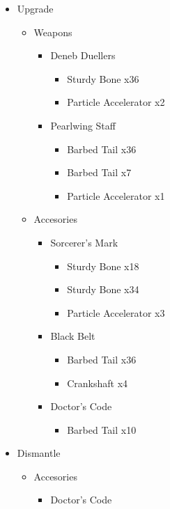 \begin{upgrade}
	\begin{itemize}
		\item Upgrade
			\begin{itemize}
				\item Weapons
					\begin{itemize}
						\item Deneb Duellers
							\begin{itemize}
								\item Sturdy Bone x36
								\item Particle Accelerator x2
							\end{itemize}
						\item Pearlwing Staff
							\begin{itemize}
								\item Barbed Tail x36
								\item Barbed Tail x7
								\item Particle Accelerator x1
							\end{itemize}
					\end{itemize}
				\item Accesories
					\begin{itemize}
						\item Sorcerer's Mark
							\begin{itemize}
								\item Sturdy Bone x18
								\item Sturdy Bone x34
								\item Particle Accelerator x3
							\end{itemize}
						\item Black Belt
							\begin{itemize}
								\item Barbed Tail x36
								\item Crankshaft x4
							\end{itemize}
						\item Doctor's Code
							\begin{itemize}
								\item Barbed Tail x10
							\end{itemize}
					\end{itemize}
			\end{itemize}
		\item Dismantle
			\begin{itemize}
				\item Accesories
					\begin{itemize}
						\item Doctor's Code
					\end{itemize}
			\end{itemize}
	\end{itemize}
\end{upgrade}

